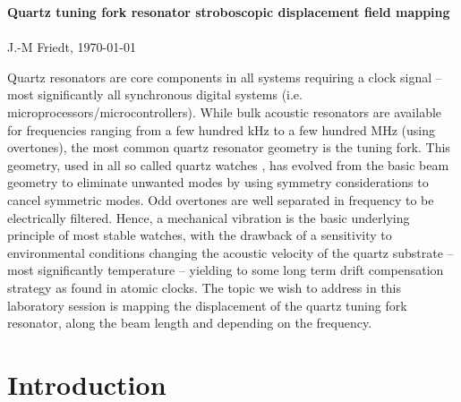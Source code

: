 \documentclass[a4paper]{article}
\begin{document}
\begin{center}
{\bf \Large Quartz tuning fork resonator stroboscopic displacement field mapping}\\ \ \\
J.-M Friedt, \today
\end{center}

Quartz resonators are core components in all systems requiring a clock signal -- most significantly
all synchronous digital systems (i.e. microprocessors/microcontrollers). While bulk acoustic resonators
are available for frequencies ranging from a few hundred kHz to a few hundred MHz (using overtones),
the most common quartz resonator geometry is the tuning fork. This geometry, used in all so called
quartz watches \cite{slom}, has evolved from the basic beam geometry to eliminate unwanted modes by using 
symmetry considerations to cancel symmetric modes. Odd overtones are well separated in frequency to be electrically filtered.
Hence, a mechanical vibration is the basic underlying principle of most stable watches, with the drawback 
of a sensitivity to environmental conditions changing the acoustic velocity of the quartz substrate -- most
significantly temperature -- yielding to some long term drift compensation strategy as found in atomic clocks.
The topic we wish to address in this laboratory session is mapping the displacement of the quartz tuning fork
resonator, along the beam length and depending on the frequency.

\noindent
{}

\section{Introduction}
\end{document}
